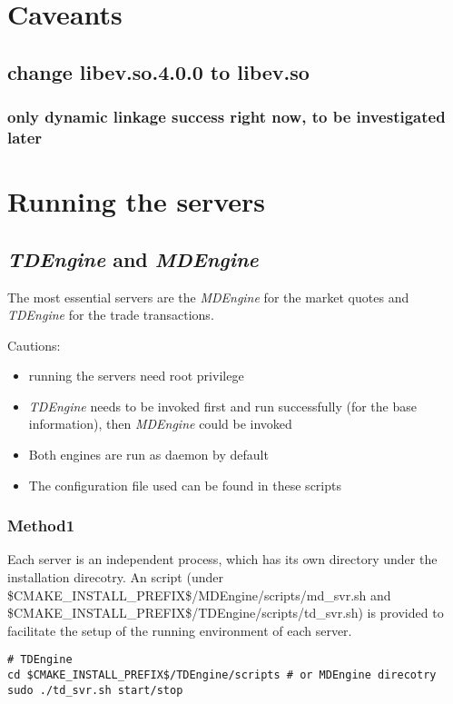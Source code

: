 \documentclass[11pt]{article}
\begin{document}
\section{Caveants}
\label{sec:orgba5f68c}
\subsection{change libev.so.4.0.0 to libev.so}
\label{sec:org6ad7a96}
\subsubsection{only dynamic linkage success right now, to be investigated later}
\label{sec:org8bc6d6b}

\section{Running the servers}
\label{sec:org2dd6709}
\subsection{\emph{TDEngine} and \emph{MDEngine}}
\label{sec:orgbd9057f}
The most essential servers are the \emph{MDEngine} for the market quotes and \emph{TDEngine} for the trade transactions.

Cautions:
\begin{itemize}
\item running the servers need root privilege
\item \emph{TDEngine} needs to be invoked first and run successfully (for the base information), then \emph{MDEngine} could be invoked
\item Both engines are run as daemon by default
\item The configuration file used can be found in these scripts
\end{itemize}

\subsubsection{Method1}
\label{sec:org483cc5a}
Each server is an independent process, which has its own directory under the installation direcotry.
An script (under \$CMAKE\_INSTALL\_PREFIX\$/MDEngine/scripts/md\_svr.sh and \$CMAKE\_INSTALL\_PREFIX\$/TDEngine/scripts/td\_svr.sh)
is provided to facilitate the setup of the running environment of each server.
\begin{verbatim}
# TDEngine
cd $CMAKE_INSTALL_PREFIX$/TDEngine/scripts # or MDEngine direcotry
sudo ./td_svr.sh start/stop
\end{verbatim}
\end{document}

